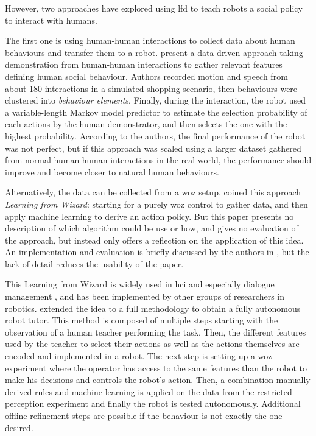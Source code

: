 	However, two approaches have explored using \gls{lfd} to teach robots a social policy to interact with humans.
	
	The first one is using human-human interactions to collect data about human behaviours and transfer them to a robot. \citet{liu2014train} present a data driven approach taking demonstration from human-human interactions to gather relevant features defining human social behaviour. Authors recorded motion and speech from about 180 interactions in a simulated shopping scenario, then behaviours were clustered into \emph{behaviour elements}. Finally, during the interaction, the robot used a variable-length Markov model predictor to estimate the selection probability of each actions by the human demonstrator, and then selects the one with the highest probability. According to the authors, the final performance of the robot was not perfect, but if this approach was scaled using a larger dataset gathered from normal human-human interactions in the real world, the performance should improve and become closer to natural human behaviours.
    
    Alternatively, the data can be collected from a \acrlong{woz} setup. \cite{knox2014learning} coined this approach \emph{Learning from Wizard}: starting for a purely \gls{woz} control to gather data, and then apply machine learning to derive an action policy. But this paper presents no description of which algorithm could be use or how, and gives no evaluation of the approach, but instead only offers a reflection on the application of this idea. An implementation and evaluation is briefly discussed by the authors in \cite{knox2016learning}, but the lack of detail reduces the usability of the paper.
    
    This Learning from Wizard is widely used in \gls{hci} and especially dialogue management \citep{rieser2008learning}, and has been implemented by other groups of researchers in robotics. \citet{sequeira2016discovering} extended the idea to a full methodology to obtain a fully autonomous robot tutor. This method is composed of multiple steps starting with the observation of a human teacher performing the task. Then, the different features used by the teacher to select their actions as well as the actions themselves are encoded and implemented in a robot. The next step is setting up a \gls{woz} experiment where the operator has access to the same features than the robot to make his decisions and controls the robot's action. Then, a combination manually derived rules and machine learning is applied on the data from the restricted-perception experiment and finally the robot is tested autonomously. Additional offline refinement steps are possible if the behaviour is not exactly the one desired. 
    

